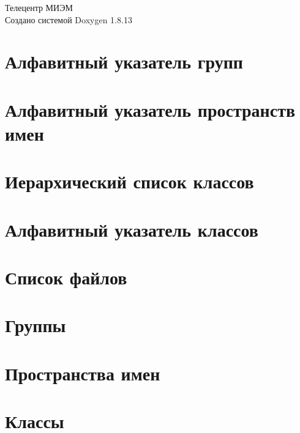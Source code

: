 \documentclass[twoside]{book}
\newcommand{\+}{\discretionary{\mbox{\scriptsize$\hookleftarrow$}}{}{}}
\newcommand{\clearemptydoublepage}{%
  \newpage{\pagestyle{empty}\cleardoublepage}%
}
\begin{document}
\hypersetup{pageanchor=false,
             bookmarksnumbered=true,
             pdfencoding=unicode
            }
\begin{titlepage}
\vspace*{7cm}
\begin{center}%
{\Large Телецентр МИЭМ }\\
\vspace*{1cm}
{\large Создано системой Doxygen 1.8.13}\\
\end{center}
\end{titlepage}
\clearemptydoublepage
{}
\tableofcontents
\clearemptydoublepage
{}
\hypersetup{pageanchor=true}

\chapter{Алфавитный указатель групп}

\chapter{Алфавитный указатель пространств имен}

\chapter{Иерархический список классов}

\chapter{Алфавитный указатель классов}

\chapter{Список файлов}

\chapter{Группы}



\chapter{Пространства имен}




\chapter{Классы}

















\end{document}
